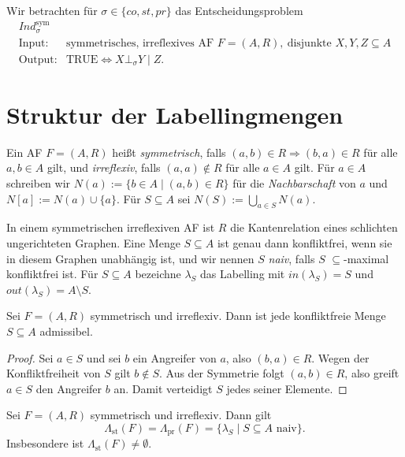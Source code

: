 Wir betrachten für \(\sigma\in\{co,st,pr\}\) das Entscheidungsproblem
\[
\begin{array}{ll}
\textit{Ind}^{\mathrm{sym}}_{\sigma}\\
\text{Input:}  & \text{symmetrisches, irreflexives AF } F=(A,R),\
                 \text{disjunkte } X,Y,Z\subseteq A \\
\text{Output:} & \text{TRUE} \Longleftrightarrow X \bot_{\sigma} Y \mid Z.
\end{array}
\]

\section{Struktur der Labellingmengen}
\label{sec:sym-struktur}

\begin{Definition}
    \label{def:sym-af}
    Ein AF \(F=(A,R)\) heißt \emph{symmetrisch}, falls
    \((a,b)\in R\Rightarrow(b,a)\in R\) für alle \(a,b\in A\) gilt, und
    \emph{irreflexiv}, falls \((a,a)\notin R\) für alle \(a\in A\) gilt. Für
    \(a\in A\) schreiben wir \(N(a):=\{b\in A\mid (a,b)\in R\}\) für die
    \emph{Nachbarschaft} von \(a\) und \(N[a]:=N(a)\cup\{a\}\). Für
    \(S\subseteq A\) sei \(N(S):=\bigcup_{a\in S}N(a)\).
\end{Definition}

In einem symmetrischen irreflexiven AF ist \(R\) die Kantenrelation eines
schlichten ungerichteten Graphen. Eine Menge \(S\subseteq A\) ist genau dann
konfliktfrei, wenn sie in diesem Graphen unabhängig ist, und wir nennen \(S\)
\emph{naiv}, falls \(S\) \(\subseteq\)-maximal konfliktfrei ist. Für
\(S\subseteq A\) bezeichne \(\lambda_S\) das Labelling mit
\(\mathit{in}(\lambda_S)=S\) und \(\mathit{out}(\lambda_S)=A\setminus S\).

\begin{Lemma}
    \label{lem:sym-cf-adm}
    Sei \(F=(A,R)\) symmetrisch und irreflexiv. Dann ist jede konfliktfreie
    Menge \(S\subseteq A\) admissibel.
\end{Lemma}

\begin{proof}
    Sei \(a\in S\) und sei \(b\) ein Angreifer von \(a\), also \((b,a)\in R\).
    Wegen der Konfliktfreiheit von \(S\) gilt \(b\notin S\). Aus der Symmetrie
    folgt \((a,b)\in R\), also greift \(a\in S\) den Angreifer \(b\) an. Damit
    verteidigt \(S\) jedes seiner Elemente.
\end{proof}

\begin{Proposition}
    \label{prop:sym-naiv-st-pr}
    Sei \(F=(A,R)\) symmetrisch und irreflexiv. Dann gilt
    \[
        \Lambda_{\mathrm{st}}(F)
        =\Lambda_{\mathrm{pr}}(F)
        =\{\lambda_S\mid S\subseteq A\text{ naiv}\}.
    \]
    Insbesondere ist \(\Lambda_{\mathrm{st}}(F)\neq\emptyset\).
\end{Proposition}

